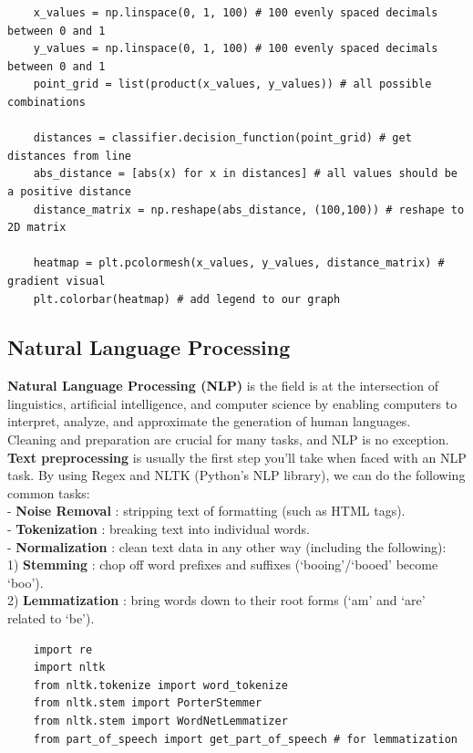 \documentclass[11pt, a4paper]{article}
\begin{document}
\begin{spacing}{1.1}
\begin{lstlisting}
	x_values = np.linspace(0, 1, 100) # 100 evenly spaced decimals between 0 and 1
	y_values = np.linspace(0, 1, 100) # 100 evenly spaced decimals between 0 and 1
	point_grid = list(product(x_values, y_values)) # all possible combinations
	
	distances = classifier.decision_function(point_grid) # get distances from line
	abs_distance = [abs(x) for x in distances] # all values should be a positive distance
	distance_matrix = np.reshape(abs_distance, (100,100)) # reshape to 2D matrix
	
	heatmap = plt.pcolormesh(x_values, y_values, distance_matrix) # gradient visual
	plt.colorbar(heatmap) # add legend to our graph \end{lstlisting} \newpage

	\subsection{Natural Language Processing}
	\textbf{Natural Language Processing (NLP)} is the field is at the intersection of linguistics, artificial intelligence, and computer science by enabling computers to interpret, analyze, and approximate the generation of human languages. \vspace*{2mm} \\
	Cleaning and preparation are crucial for many tasks, and NLP is no exception. \textbf{Text preprocessing} is usually the first step you’ll take when faced with an NLP task. By using Regex and NLTK (Python's NLP library), we can do the following common tasks: \\
	\hspace*{2mm} - \textbf{Noise Removal} : stripping text of formatting (such as HTML tags). \\
	\hspace*{2mm} - \textbf{Tokenization} : breaking text into individual words. \\
	\hspace*{2mm} - \textbf{Normalization} : clean text data in any other way (including the following): \\
	\hspace*{8mm} 1) \textbf{Stemming} : chop off word prefixes and suffixes (`booing'/`booed' become `boo'). \\
	\hspace*{8mm} 2) \textbf{Lemmatization} : bring words down to their root forms (`am' and `are' related to `be').
	\begin{lstlisting}
	import re
	import nltk
	from nltk.tokenize import word_tokenize
	from nltk.stem import PorterStemmer
	from nltk.stem import WordNetLemmatizer
	from part_of_speech import get_part_of_speech # for lemmatization
	

\end{lstlisting}
\end{spacing}
\end{document}
